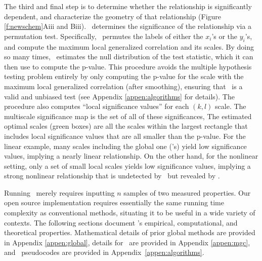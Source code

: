 \documentclass[11pt]{article}
\begin{document}
The third and final step is to determine whether the relationship is significantly dependent, and characterize the geometry of that relationship (Figure \ref{f:newschem}{\color{magenta}Aiii} and {\color{magenta}Biii}).  
\Mgc~determines the significance of the relationship via a permutation test.  
Specifically, \Mgc~permutes the labels of either the $x_i$'s or the $y_i$'s, and compute the maximum local generalized correlation and its scales.
By doing so many times, \Mgc~estimates the null distribution of the test statistic, which it can then use to compute the p-value.  
This procedure avoids the multiple hypothesis testing problem entirely by only computing the p-value for the scale with the maximum local generalized correlation (after smoothing), ensuring that \Mgc~is a valid and unbiased test (see Appendix \ref{appen:algorithms} for details).  
The procedure also computes ``local significance values''  for each $(k,l)$ scale.  The multiscale significance map is the set of all of these significances, 
The estimated optimal scales (green boxes) are all the scales within the largest rectangle that includes local significance values that are all smaller than the p-value.
For the linear example, many scales including the global one (\Dcorr's) yield low significance values, implying a nearly linear relationship.
On the other hand, for the nonlinear setting, only a set of small local scales yields low significance values, implying a strong nonlinear relationship that is undetected by \Dcorr~but revealed by \Mgc.



Running \Mgc~merely requires inputting $n$ samples of two measured properties.  
Our open source implementation\footnotemark{} requires essentially the same running  time complexity as conventional methods, situating it to be useful in a wide variety of contexts. 
The following sections document \Mgc's empirical, computational, and theoretical properties. Mathematical details of prior global methods are provided in Appendix \ref{appen:global}, details for \Mgc~are provided in Appendix \ref{appen:mgc}, and \Mgc~pseudocodes are provided in Appendix~\ref{appen:algorithms}.
\end{document}
